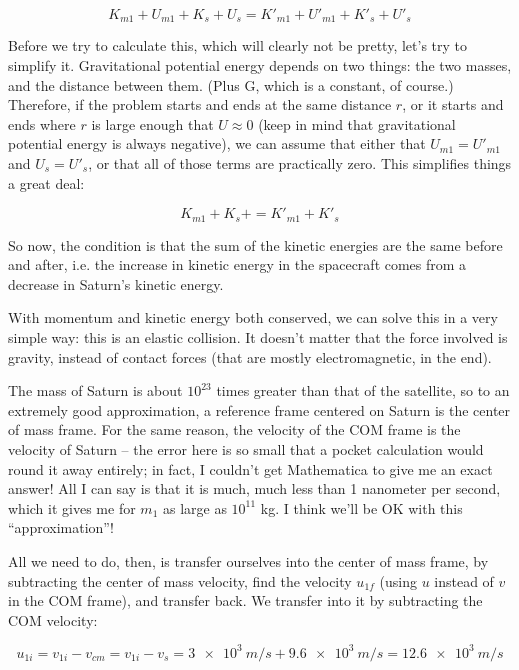 \documentclass[12pt,a4paper]{report}
\begin{document}
\begin{equation}
K_{m1} + U_{m1} + K_s + U_{s} = K'_{m1} + U'_{m1} + K'_s + U'_{s}
\end{equation}

Before we try to calculate this, which will clearly not be pretty, let's try to simplify it. Gravitational potential energy depends on two things: the two masses, and the distance between them. (Plus G, which is a constant, of course.) Therefore, if the problem starts and ends at the same distance $r$, or it starts and ends where $r$ is large enough that $U \approx 0$ (keep in mind that gravitational potential energy is always negative), we can assume that either that $U_{m1} = U'_{m1}$ and $U_s = U'_s$, or that all of those terms are practically zero. This simplifies things a great deal:

\begin{equation}
K_{m1} + K_s + = K'_{m1} + K'_s
\end{equation}

So now, the condition is that the sum of the kinetic energies are the same before and after, i.e. the increase in kinetic energy in the spacecraft comes from a decrease in Saturn's kinetic energy. 

With momentum and kinetic energy both conserved, we can solve this in a very simple way: this is an elastic collision. It doesn't matter that the force involved is gravity, instead of contact forces (that are mostly electromagnetic, in the end).

The mass of Saturn is about $10^{23}$ times greater than that of the satellite, so to an extremely good approximation, a reference frame centered on Saturn is the center of mass frame. For the same reason, the velocity of the COM frame is the velocity of Saturn -- the error here is so small that a pocket calculation would round it away entirely; in fact, I couldn't get Mathematica to give me an exact answer! All I can say is that it is much, much less than 1 nanometer per second, which it gives me for $m_1$ as large as $10^{11}$ kg. I think we'll be OK with this ``approximation''!

All we need to do, then, is transfer ourselves into the center of mass frame, by subtracting the center of mass velocity, find the velocity $u_{1f}$ (using $u$ instead of $v$ in the COM frame), and transfer back. We transfer into it by subtracting the COM velocity:

\begin{equation}
u_{1i} = v_{1i} - v_{cm} = v_{1i} - v_s = \SI{3e3}{m/s} + \SI{9.6e3}{m/s} = \SI{12.6e3}{m/s}
\end{equation}
\end{document}
